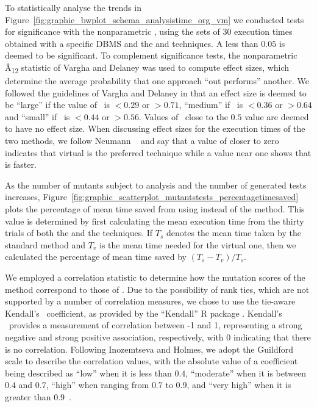 
To statistically analyse the trends in Figure~\ref{fig:graphic_bwplot_schema_analysistime_org_vm} we conducted tests for significance with the nonparametric \wilcoxon, using the sets of 30 execution times obtained with a specific DBMS and the \Original and \vma techniques.  A \pvalue less than $0.05$ is deemed to be significant.  To complement significance tests, the nonparametric \^{A}\textsubscript{12} statistic of Vargha and Delaney \cite{Vargha2000} was used to compute effect sizes, which determine the average probability that one approach ``out performs'' another.  We followed the guidelines of Vargha and Delaney in that an effect size is deemed to be ``large'' if the value of \atwelve~is $< 0.29$ or $> 0.71$, ``medium'' if \atwelve~is $< 0.36$ or $> 0.64$ and ``small'' if \atwelve~is $< 0.44$ or $> 0.56$.  Values of \atwelve~close to the $0.5$ value are deemed to have no effect size.  When discussing effect sizes for the execution times of the two methods, we follow Neumann \etal~\cite{Neumann2015} and say that a value of \atwelve closer to zero indicates that virtual is the preferred technique while a value near one shows that \Original is faster.


As the number of mutants subject to analysis and the number of generated tests increases, Figure~\ref{fig:graphic_scatterplot_mutantstests_percentagetimesaved} plots the percentage of mean time saved from using \vma instead of the \Original method.  This value is determined by first calculating the mean execution time from the thirty trials of both the \Standard and the \virtual techniques. If $T_s$ denotes the mean time taken by the standard method and $T_v$ is the mean time needed for the virtual one, then we calculated the percentage of mean time saved by $({T_s - T_v})/{T_s}$.


We employed a correlation statistic to determine how the mutation scores of the \tc method correspond to those of \vma.  Due to the possibility of rank ties, which are not supported by a number of correlation measures, we chose to use the tie-aware Kendall's \taub~coefficient, as provided by the ``Kendall'' R package \cite{KendallCran}.  Kendall's \taub~provides a measurement of correlation between -1 and 1, representing a strong negative and strong positive association, respectively, with 0 indicating that there is no correlation. Following Inozemtseva and Holmes, we adopt the Guildford scale to describe the correlation values, with the absolute value of a coefficient being described as ``low'' when it is less than $0.4$, ``moderate'' when it is between $0.4$ and $0.7$, ``high'' when ranging from $0.7$ to $0.9$, and ``very high'' when it is greater than \mbox{$0.9$ \cite{Inozemtseva2014}}.


